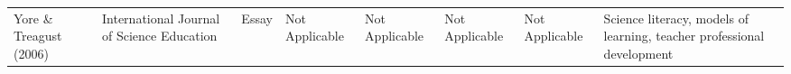\documentclass[11.5pt]{sig-alternate}
\begin{document}
\begin{@twocolumnfalse}
\begin{table}
\begin{tabular}{m{0.72in}m{0.72in}m{0.72in}m{0.72in}m{0.72in}m{0.72in}m{0.72in}m{0.72in}}
Yore \&   Treagust (2006)                         & International Journal of Science Education                      & Essay                                 &  \centering Not Applicable                                                                               &  \centering Not Applicable                                    &  \centering Not Applicable                                                                                         &  \centering Not Applicable                                                   & Science literacy, models of learning, teacher professional development               \hline     
\end{tabular}
\end{table}
\end{@twocolumnfalse}
\end{document}
